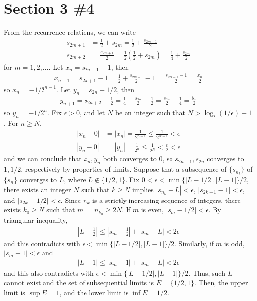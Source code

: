 \documentclass{scrartcl}
\begin{document}
\section{Section 3 \#4}
From the recurrence relations, we can write
\begin{align*}
  s_{2m + 1} &= \frac{1}{2} + s_{2m} = \frac{1}{2} + \frac{s_{2m - 1}}{2} \\
  s_{2m + 2} &= \frac{s_{2m + 1}}{2} = \frac{1}{2} \left( \frac{1}{2} + s_{2m} \right) = \frac{1}{4} + \frac{s_{2m}}{2}
\end{align*}
for \(m = 1, 2, \dots\).
Let \(x_n = s_{2n - 1} - 1\), then
\begin{align*}
  x_{n + 1} = s_{2n + 1} - 1 = \frac{1}{2} + \frac{s_{2m - 1}}{2} - 1 = \frac{s_{2m - 1} - 1}{2} = \frac{x_n}{2}
\end{align*}
so \(x_n = -1/2^{n - 1}\).
Let \(y_n = s_{2n} - 1/2\), then
\begin{align*}
  y_{n + 1} = s_{2n + 2} - \frac{1}{2} = \frac{1}{4} + \frac{s_{2n}}{2} - \frac{1}{2} = \frac{s_{2n}}{2} - \frac{1}{4} = \frac{y_n}{2}
\end{align*}
so \(y_n = -1/2^n\).
Fix \(\epsilon > 0\), and let \(N\) be an integer such that \(N > \log_2 (1 / \epsilon) + 1\).
For \(n \geq N\),
\begin{align*}
  |x_n - 0| &= |x_n| = \frac{1}{2^{n - 1}} \leq \frac{1}{2^{N - 1}} < \epsilon \\
  |y_n - 0| &= |y_n| = \frac{1}{2^n} \leq \frac{1}{2^N} < \frac{\epsilon}{2} < \epsilon
\end{align*}
and we can conclude that \(x_n, y_n\) both converges to \(0\), so \(s_{2n - 1}, s_{2n}\) converges to \(1, 1 / 2\), respectively by properties of limits.
Suppose that a subsequence of \(\{s_{n_k}\}\) of \(\{s_n\}\) converges to \(L\), where \(L \not \in \{1/2, 1\}\).
Fix \(0 < \epsilon < \min\{|L - 1/2|, |L - 1|\} / 2\), there exists an integer \(N\) such that \(k \geq N\) implies \(|s_{n_k} - L| < \epsilon\), \(|s_{2k - 1} - 1| < \epsilon\), and \(|s_{2k} - 1/2| < \epsilon\).
Since \(n_k\) is a strictly increasing sequence of integers, there exists \(k_0 \geq N\) such that \(m := n_{k_0} \geq 2N\).
If \(m\) is even, \(|s_m - 1 / 2| < \epsilon\).
By triangular inequality,
\begin{align*}
  \left| L - \frac{1}{2} \right| \leq \left| s_m - \frac{1}{2} \right| + |s_m - L| < 2\epsilon
\end{align*}
and this contradicts with \(\epsilon < \min\{|L - 1/2|, |L - 1|\} / 2\).
Similarly, if \(m\) is odd, \(|s_m - 1| < \epsilon\) and
\begin{align*}
  |L - 1| \leq |s_m - 1| + |s_m - L| < 2\epsilon
\end{align*}
and this also contradicts with \(\epsilon < \min\{|L - 1/2|, |L - 1|\} / 2\).
Thus, such \(L\) cannot exist and the set of subsequential limits is \(E = \{1/2, 1\}\).
Then, the upper limit is \(\sup E = 1\), and the lower limit is \(\inf E = 1 / 2\).
\end{document}
